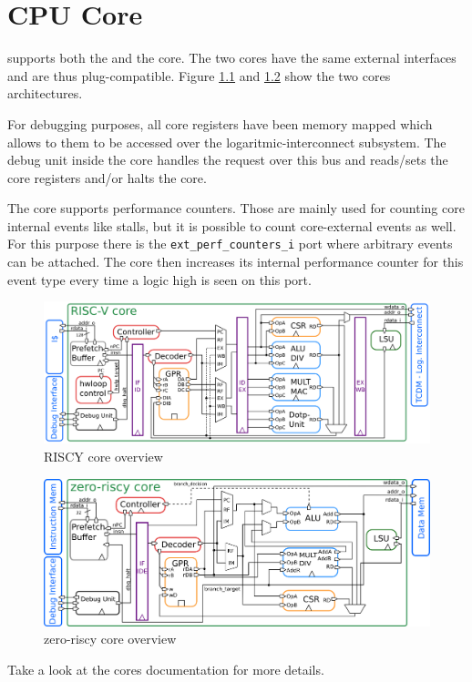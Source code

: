 \chapter{CPU Core}

\pulpissimo supports both the \riscy and the \zeroriscy \riscv core.
The two cores have the same external interfaces and are thus plug-compatible.
Figure \ref{fig:riscy_core} and \ref{fig:zero_core} show the two cores
architectures.

For debugging purposes, all core registers have been memory mapped which allows
to them to be accessed over the logaritmic-interconnect subsystem. The debug unit inside the core handles the request over this bus and reads/sets the core registers and/or halts the core.

The core supports performance counters. Those are mainly used for counting core
internal events like stalls, but it is possible to count core-external events
as well. For this purpose there is the \texttt{ext\_perf\_counters\_i} port where
arbitrary events can be attached. The core then increases its internal
performance counter for this event type every time a logic high is seen on this
port.

\begin{figure}[ht]
  \centering
  \includegraphics[width=\textwidth]{./figures/riscy_archi.png}
  \caption{RISCY core overview}
  \label{fig:riscy_core}
\end{figure}

\begin{figure}[ht]
  \centering
  \includegraphics[width=\textwidth]{./figures/zeroriscy_archi.png}
  \caption{zero-riscy core overview}
  \label{fig:zero_core}
\end{figure}

Take a look at the cores documentation for more details.